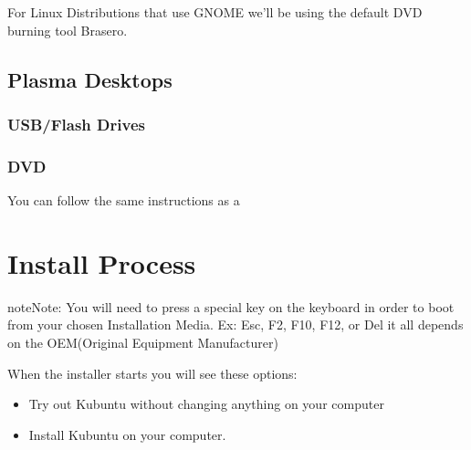 \documentclass[letterpaper,10pt,english]{sphinxmanual}
\begin{document}
\sphinxAtStartPar
For Linux Distributions that use GNOME we’ll be using the default DVD burning tool Brasero.


\subsection{Plasma Desktops}
\label{\detokenize{docs/installation:plasma-desktops}}

\subsubsection{USB/Flash Drives}
\label{\detokenize{docs/installation:id5}}

\subsubsection{DVD}
\label{\detokenize{docs/installation:id6}}
\sphinxAtStartPar
You can follow the same instructions as a {\hyperref[\detokenize{docs/installation:kubuntu-install-link}]{}}


\section{Install Process}
\label{\detokenize{docs/installation:install-process}}
\begin{sphinxadmonition}{note}{Note:}
\sphinxAtStartPar
You will need to press a special key on the keyboard in order to boot from your chosen Installation Media. Ex: Esc, F2, F10, F12, or Del it all depends on the OEM(Original Equipment Manufacturer)
\end{sphinxadmonition}


\sphinxAtStartPar
When the installer starts you will see these options:
\begin{itemize}
\item {} 
\sphinxAtStartPar
Try out Kubuntu without changing anything on your computer

\item {} 
\sphinxAtStartPar
Install Kubuntu on your computer.

\end{itemize}
\end{document}
